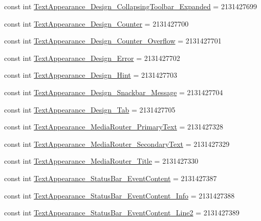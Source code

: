 \begin{CompactItemize}
\item 
const int \hyperlink{class__2doo_1_1_droid_1_1_resource_1_1_style_9e1fbc88ca1462636a58e3586625abfa}{TextAppearance\_\-Design\_\-CollapsingToolbar\_\-Expanded} = 2131427699
\item 
const int \hyperlink{class__2doo_1_1_droid_1_1_resource_1_1_style_1c9d0a17b346846dd92881d5351ebbb8}{TextAppearance\_\-Design\_\-Counter} = 2131427700
\item 
const int \hyperlink{class__2doo_1_1_droid_1_1_resource_1_1_style_ba0dddff371dfa1910a3c4220fda0eab}{TextAppearance\_\-Design\_\-Counter\_\-Overflow} = 2131427701
\item 
const int \hyperlink{class__2doo_1_1_droid_1_1_resource_1_1_style_ee66f33e04a8048cd1f7c5a9b07b0777}{TextAppearance\_\-Design\_\-Error} = 2131427702
\item 
const int \hyperlink{class__2doo_1_1_droid_1_1_resource_1_1_style_0978b2dac6eff99802a480e9756d3c48}{TextAppearance\_\-Design\_\-Hint} = 2131427703
\item 
const int \hyperlink{class__2doo_1_1_droid_1_1_resource_1_1_style_e7f96c308563e688305e671f16307f53}{TextAppearance\_\-Design\_\-Snackbar\_\-Message} = 2131427704
\item 
const int \hyperlink{class__2doo_1_1_droid_1_1_resource_1_1_style_8b41288c813a05f853c620afbe304fb6}{TextAppearance\_\-Design\_\-Tab} = 2131427705
\item 
const int \hyperlink{class__2doo_1_1_droid_1_1_resource_1_1_style_726c9392d3a2fbf5786fe05054cd78d6}{TextAppearance\_\-MediaRouter\_\-PrimaryText} = 2131427328
\item 
const int \hyperlink{class__2doo_1_1_droid_1_1_resource_1_1_style_3c234096e5d8bb7aae15ca859289d213}{TextAppearance\_\-MediaRouter\_\-SecondaryText} = 2131427329
\item 
const int \hyperlink{class__2doo_1_1_droid_1_1_resource_1_1_style_8157efdcde528beb27ebad5edc385538}{TextAppearance\_\-MediaRouter\_\-Title} = 2131427330
\item 
const int \hyperlink{class__2doo_1_1_droid_1_1_resource_1_1_style_5c7f6a834246527872a732a8c4dae480}{TextAppearance\_\-StatusBar\_\-EventContent} = 2131427387
\item 
const int \hyperlink{class__2doo_1_1_droid_1_1_resource_1_1_style_06d65312a04a845cc81bb6ba2d5437a4}{TextAppearance\_\-StatusBar\_\-EventContent\_\-Info} = 2131427388
\item 
const int \hyperlink{class__2doo_1_1_droid_1_1_resource_1_1_style_2dda33bf6433814216f729fc3df1a04a}{TextAppearance\_\-StatusBar\_\-EventContent\_\-Line2} = 2131427389

\end{CompactItemize}
